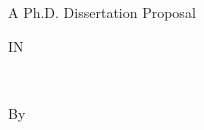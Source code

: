 
\ssp
\begin{alwayssingle}
    \let\footnotesize\small
    \let\footnoterule\relax
    \thispagestyle{empty}
    \setcounter{page}{1}

    \null\vfil
    \begin{center}
    \fmfont
    \uppercase\expandafter{\@title} \par
    \bigskip \medskip
\vspace{6ex}
    A Ph.D. Dissertation Proposal \par
\bigskip
    \bigskip \medskip
    IN \par
    \bigskip \medskip
    \uppercase\expandafter{\@field} \par
    \bigskip \medskip
    \uppercase\expandafter{\@degreemonth~\@degreeyear} \par
    \bigskip \bigskip \bigskip \bigskip
    By \par
    {\@author} \par
    \bigskip \bigskip
\end{center}
    \vfil\null
\end{alwayssingle}

\setcounter{footnote}{0}
